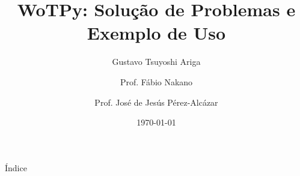 \documentclass{beamer}
\title[WoTPy]{WoTPy: Solução de Problemas e Exemplo de Uso}
\author[Gustavo Tsuyoshi Ariga]{Gustavo Tsuyoshi Ariga \\ \and Prof. Fábio Nakano \\ \and Prof. José de Jesús Pérez-Alcázar} %
\institute{ACH2017}
\date{\today}
\begin{document}

\frame{\titlepage}

\begin{frame}{Índice}
    \tableofcontents
\end{frame}








\end{document}
